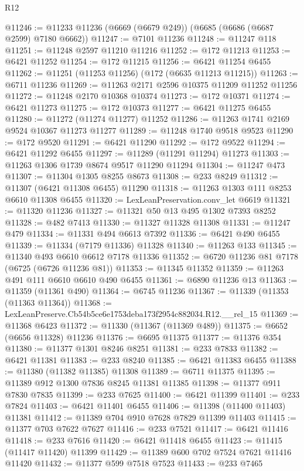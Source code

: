 \begin{lexlean}{R12}
\begin{coremodule}
@11246 := @11233 @11236 (@6669 (@6679 @249)) (@6685 (@6686 (@6687 @2599) @7180 @6662))
@11247 := @7101 @11236
@11248 := @11247 @118
@11251 := @11248 @2597 @11210 @11216
@11252 := @172 @11213
@11253 := @6421 @11252
@11254 := @172 @11215
@11256 := @6421 @11254 @6455
@11262 := @11251 (@11253 @11256) (@172 (@6635 @11213 @11215))
@11263 := @6711 @11236
@11269 := @11263 @2171 @2596 @10375 @11209 @11252 @11256
@11272 := @11248 @2170 @10368 @10374
@11273 := @172 @10371
@11274 := @6421 @11273
@11275 := @172 @10373
@11277 := @6421 @11275 @6455
@11280 := @11272 (@11274 @11277) @11252
@11286 := @11263 @1741 @2169 @9524 @10367 @11273 @11277
@11289 := @11248 @1740 @9518 @9523
@11290 := @172 @9520
@11291 := @6421 @11290
@11292 := @172 @9522
@11294 := @6421 @11292 @6455
@11297 := @11289 (@11291 @11294) @11273
@11303 := @11263 @1306 @1739 @8674 @9517 @11290 @11294
@11304 := @11247 @473
@11307 := @11304 @1305 @8255 @8673
@11308 := @233 @8249
@11312 := @11307 (@6421 @11308 @6455) @11290
@11318 := @11263 @1303 @111 @8253 @6610 @11308 @6455
@11320 := LexLeanPreservation.conv_let @6619
@11321 := @11320 @11236
@11327 := @11321 @50 @13 @495 @1302 @7393 @8252
@11328 := @482 @7413
@11330 := @11327 @11328 @11308
@11331 := @11247 @479
@11334 := @11331 @494 @6613 @7392
@11336 := @6421 @490 @6455
@11339 := @11334 (@7179 @11336) @11328
@11340 := @11263 @133
@11345 := @11340 @493 @6610 @6612 @7178 @11336
@11352 := @6720 @11236 @81 @7178 (@6725 (@6726 @11236 @81))
@11353 := @11345 @11352
@11359 := @11263 @491 @111 @6610 @6610 @490 @6455
@11361 := @6890 @11236 @13
@11363 := @11359 (@11361 @490)
@11364 := @6745 @11236
@11367 := @11339 (@11353 (@11363 @11364))
@11368 := LexLeanPreserve.Cb54b5ce6e1753deba173f2954c882034.R12.__rel_15
@11369 := @11368 @6423
@11372 := @11330 (@11367 (@11369 @489))
@11375 := @6652 (@6656 @11328) @11236
@11376 := @6695 @11375
@11377 := @11376 @354
@11380 := @11377 @1301 @8246 @8251
@11381 := @233 @7833
@11382 := @6421 @11381
@11383 := @233 @8240
@11385 := @6421 @11383 @6455
@11388 := @11380 (@11382 @11385) @11308
@11389 := @6711 @11375
@11395 := @11389 @912 @1300 @7836 @8245 @11381 @11385
@11398 := @11377 @911 @7830 @7835
@11399 := @233 @7625
@11400 := @6421 @11399
@11401 := @233 @7824
@11403 := @6421 @11401 @6455
@11406 := @11398 (@11400 @11403) @11381
@11412 := @11389 @704 @910 @7628 @7829 @11399 @11403
@11415 := @11377 @703 @7622 @7627
@11416 := @233 @7521
@11417 := @6421 @11416
@11418 := @233 @7616
@11420 := @6421 @11418 @6455
@11423 := @11415 (@11417 @11420) @11399
@11429 := @11389 @600 @702 @7524 @7621 @11416 @11420
@11432 := @11377 @599 @7518 @7523
@11433 := @233 @7465

\end{coremodule}
\end{lexlean}
